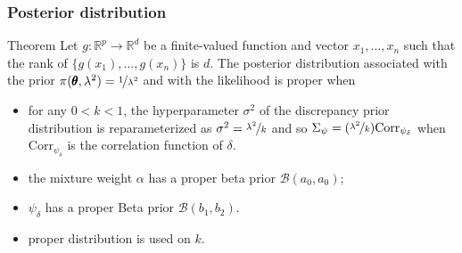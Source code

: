 \documentclass[nopagenumber,9pt]{beamer}
\begin{document}
 \begin{frame}
  \frametitle{Posterior distribution}
  
   \begin{beamerboxesrounded}{Theorem}
Let $g: \mathbb{R}^p \to \mathbb{R}^d$ be a finite-valued function and vector $x_1,\ldots,x_n$ such that the rank of $\{g(x_1),\ldots,g(x_n)\}$ is $d$.
The posterior distribution associated with the prior $\pi(\pmb{\theta}, \lambda^2)=\nicefrac{1}{\lambda^2}$ and with the likelihood is proper when
\begin{itemize}
\item for any $0<k<1$, the hyperparameter $\sigma^2$ of the discrepancy prior distribution is reparameterized as $\sigma^2=\nicefrac{\lambda^2}{k} $ and so $\Sigma_\psi=(\nicefrac{\lambda^2}{k})  \text{Corr}_{\psi_\delta}$ when $\text{Corr}_{\psi_\delta}$ is the correlation function of $\delta$. %
\item the mixture weight $\alpha$ has a proper beta prior $\mathcal{B}(a_0, a_0)$; 
\item $\psi_\delta$ has a proper Beta prior $\mathcal{B}(b_1, b_2)$.
\item proper distribution is used on $k$.
\end{itemize}

 \end{beamerboxesrounded}

 \end{frame}

 
 
\end{document}
